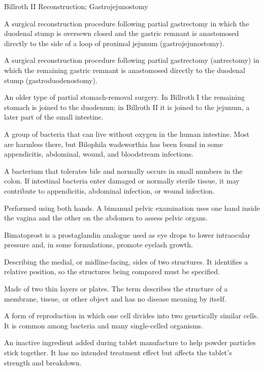 \synonyms
Billroth II Reconstruction; Gastrojejunostomy

 A surgical reconstruction procedure following partial gastrectomy in which the duodenal stump is oversewn closed and the gastric remnant is anastomosed directly to the side of a loop of proximal jejunum (gastrojejunostomy).

 A surgical reconstruction procedure following partial gastrectomy (antrectomy) in which the remaining gastric remnant is anastomosed directly to the duodenal stump (gastroduodenostomy).

 An older type of partial stomach-removal surgery. In Billroth I the remaining stomach is joined to the duodenum; in Billroth II it is joined to the jejunum, a later part of the small intestine.

 A group of bacteria that can live without oxygen in the human intestine. Most are harmless there, but Bilophila wadsworthia has been found in some appendicitis, abdominal, wound, and bloodstream infections.

 A bacterium that tolerates bile and normally occurs in small numbers in the colon. If intestinal bacteria enter damaged or normally sterile tissue, it may contribute to appendicitis, abdominal infection, or wound infection.

 Performed using both hands. A bimanual pelvic examination uses one hand inside the vagina and the other on the abdomen to assess pelvic organs.

 Bimatoprost is a prostaglandin analogue used as eye drops to lower intraocular pressure and, in some formulations, promote eyelash growth.

 Describing the medial, or midline-facing, sides of two structures. It identifies a relative position, so the structures being compared must be specified.

 Made of two thin layers or plates. The term describes the structure of a membrane, tissue, or other object and has no disease meaning by itself.

 A form of reproduction in which one cell divides into two genetically similar cells. It is common among bacteria and many single-celled organisms.

 An inactive ingredient added during tablet manufacture to help powder particles stick together. It has no intended treatment effect but affects the tablet's strength and breakdown.

